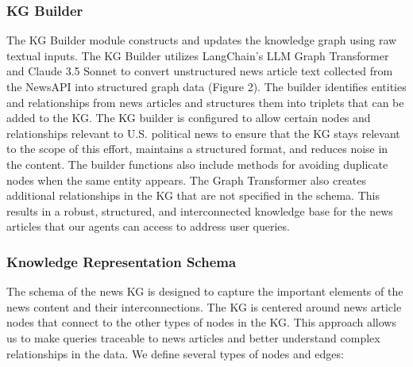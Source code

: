 \documentclass[11pt]{article}
\begin{document}
\subsubsection{KG Builder}

The KG Builder module constructs and updates the knowledge graph using raw textual inputs. The KG Builder utilizes LangChain’s LLM Graph Transformer and Claude 3.5 Sonnet to convert unstructured news article text collected from the NewsAPI into structured graph data (Figure 2). The builder identifies entities and relationships from news articles and structures them into triplets that can be added to the KG.
The KG builder is configured to allow certain nodes and relationships relevant to U.S. political news to ensure that the KG stays relevant to the scope of this effort, maintains a structured format, and reduces noise in the content. The builder functions also include methods for avoiding duplicate nodes when the same entity appears. The Graph Transformer also creates additional relationships in the KG that are not specified in the schema. This results in a robust, structured, and interconnected knowledge base for the news articles that our agents can access to address user queries.

\subsubsection{Knowledge Representation Schema}

The schema of the news KG is designed to capture the important elements of the news content and their interconnections. The KG is centered around news article nodes that connect to the other types of nodes in the KG. This approach allows us to make queries traceable to news articles and better understand complex relationships in the data. We define several types of nodes and edges:
\end{document}
